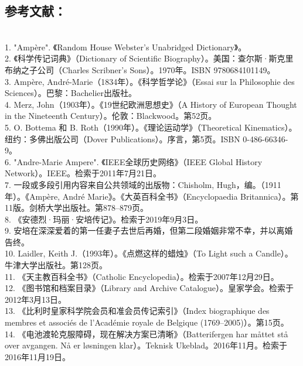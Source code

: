 \subsection{参考文献：}\\
1. "Ampère". 《Random House Webster's Unabridged Dictionary》。\\ 
2. 《科学传记词典》（Dictionary of Scientific Biography）。美国：查尔斯·斯克里布纳之子公司（Charles Scribner's Sons）。1970年。ISBN 9780684101149。\\ 
3. Ampère, André-Marie（1834年）。《科学哲学论》（Essai sur la Philosophie des Sciences）。巴黎：Bachelier出版社。\\ 
4. Merz, John（1903年）。《19世纪欧洲思想史》（A History of European Thought in the Nineteenth Century）。伦敦：Blackwood。第52页。\\
5. O. Bottema 和 B. Roth（1990年）。《理论运动学》（Theoretical Kinematics）。纽约：多佛出版公司（Dover Publications）。序言，第5页。ISBN 0-486-66346-9。\\
6. "Andre-Marie Ampere". 《IEEE全球历史网络》（IEEE Global History Network）。IEEE。检索于2011年7月21日。\\
7. 一段或多段引用内容来自公共领域的出版物：Chisholm, Hugh，编。（1911年）。《Ampère, André Marie》。《大英百科全书》（Encyclopaedia Britannica）。第11版。剑桥大学出版社。第878–879页。\\
8. 《安德烈·玛丽·安培传记》。检索于2019年9月3日。\\
9. 安培在深深爱着的第一任妻子去世后再婚，但第二段婚姻非常不幸，并以离婚告终。\\
10. Laidler, Keith J.（1993年）。《点燃这样的蜡烛》（To Light such a Candle）。牛津大学出版社。第128页。\\
11. 《天主教百科全书》（Catholic Encyclopedia）。检索于2007年12月29日。\\
12. 《图书馆和档案目录》（Library and Archive Catalogue）。皇家学会。检索于2012年3月13日。\\
13. 《比利时皇家科学院会员和准会员传记索引》（Index biographique des membres et associés de l'Académie royale de Belgique (1769–2005)）。第15页。\\
14. 《电池渡轮克服障碍，现在解决方案已清晰》（Batterifergen har måttet stå over avgangen. Nå er løsningen klar）。Teknisk Ukeblad。2016年11月。检索于2016年11月19日。
